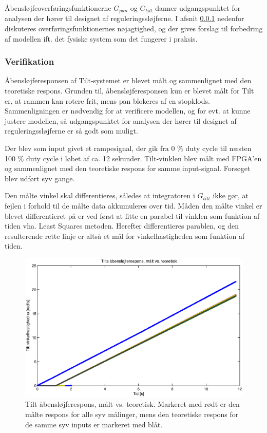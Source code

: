 Åbensløjfeoverføringsfunktionerne \(G_{pan}\) og \(G_{tilt}\) danner udgangspunktet
for analysen der hører til designet af reguleringssløjferne.
I afsnit \ref{subsec:verifikation} nedenfor diskuteres overføringsfunktionernes nøjagtighed,
og der gives forslag til forbedring af modellen ift. det fysiske system som det fungerer
i praksis.

\subsubsection{Verifikation}
\label{subsec:verifikation}
Åbensløjferesponsen af Tilt-systemet er blevet målt og sammenlignet med den teoretiske respons.
Grunden til, åbensløjferesponsen kun er blevet målt for Tilt er, at rammen kan rotere frit,
mens pan blokeres af en stopklods.
Sammenligningen er nødvendig for at verificere modellen, og for evt. at kunne justere modellen,
så udgangspunktet for analysen der hører til designet af reguleringssløjferne er så godt som muligt.

Der blev som input givet et rampesignal, der gik fra 0 \% duty cycle til næsten 100 \% duty cycle
i løbet af ca. 12 sekunder. Tilt-vinklen blev målt med FPGA'en og sammenlignet med den teoretiske
respons for samme input-signal.
Forsøget blev udført syv gange.

Den målte vinkel skal differentieres, således at integratoren i \(G_{tilt}\) ikke gør,
at fejlen i forhold til de målte data akkumuleres over tid.
Måden den målte vinkel er blevet differentieret på er ved først at fitte en parabel
til vinklen som funktion af tiden vha. Least Squares metoden. Herefter differentieres
parablen, og den resulterende rette linje er altså et mål for vinkelhastigheden som funktion af tiden.

\begin{figure}[th!]
	\centering
	\includegraphics[width=1\textwidth]{./graphics/openloopVelocity1.eps}
	\caption[Tilt åbensløjferespons, målt vs. teoretisk]
		{Tilt åbensløjferespons, målt vs. teoretisk.
		Markeret med rødt er den målte respons for alle syv målinger,
		mens den teoretiske respons for de samme syv inputs er markeret med blåt.}
	\label{fig:openloopV1}
\end{figure}

